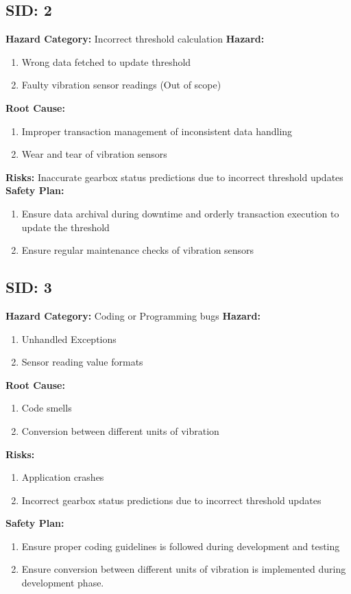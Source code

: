 \subsection{SID: 2}		
\textbf{Hazard Category:} Incorrect threshold calculation
\textbf{Hazard:}
\begin{enumerate}
	\item Wrong data fetched to update threshold
	\item Faulty vibration sensor readings (Out of scope)
\end{enumerate}
\textbf{Root Cause:}
\begin{enumerate}
	\item Improper transaction management of inconsistent data handling
	\item Wear and tear of vibration sensors
\end{enumerate}
\textbf{Risks:} Inaccurate gearbox status predictions due to incorrect threshold updates\\
\textbf{Safety Plan:}
\begin{enumerate}
	\item Ensure data archival during downtime and orderly transaction execution to update the threshold
	\item Ensure regular maintenance checks of vibration sensors
\end{enumerate}

\subsection{SID: 3}		
\textbf{Hazard Category:} Coding or Programming bugs
\textbf{Hazard:}
\begin{enumerate}
	\item Unhandled Exceptions
	\item Sensor reading value formats
\end{enumerate}
\textbf{Root Cause:}
\begin{enumerate}
	\item Code smells
	\item Conversion between different units of vibration
\end{enumerate}
\textbf{Risks:} 
 \begin{enumerate}
 	\item Application crashes
 	\item Incorrect gearbox status predictions due to incorrect threshold updates
 \end{enumerate}
 
\textbf{Safety Plan:}
\begin{enumerate}
	\item Ensure proper coding guidelines is followed during development and testing
	\item Ensure conversion between different units of vibration is implemented during development phase.
\end{enumerate}

